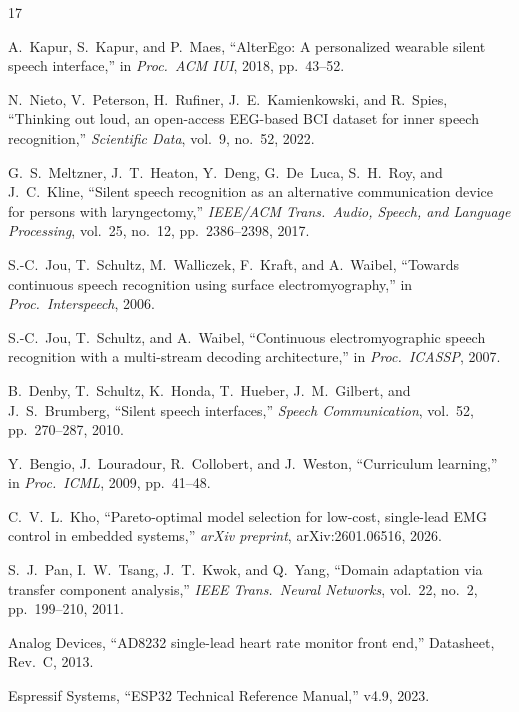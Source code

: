 \documentclass{article}
\begin{document}
\begin{thebibliography}{17}

A.\ Kapur, S.\ Kapur, and P.\ Maes, ``AlterEgo: A personalized wearable silent speech interface,'' in \emph{Proc.\ ACM IUI}, 2018, pp.\ 43--52.

N.\ Nieto, V.\ Peterson, H.\ Rufiner, J.~E.\ Kamienkowski, and R.\ Spies, ``Thinking out loud, an open-access EEG-based BCI dataset for inner speech recognition,'' \emph{Scientific Data}, vol.~9, no.~52, 2022.

G.~S.\ Meltzner, J.~T.\ Heaton, Y.\ Deng, G.\ De~Luca, S.~H.\ Roy, and J.~C.\ Kline, ``Silent speech recognition as an alternative communication device for persons with laryngectomy,'' \emph{IEEE/ACM Trans.\ Audio, Speech, and Language Processing}, vol.~25, no.~12, pp.\ 2386--2398, 2017.

S.-C.\ Jou, T.\ Schultz, M.\ Walliczek, F.\ Kraft, and A.\ Waibel, ``Towards continuous speech recognition using surface electromyography,'' in \emph{Proc.\ Interspeech}, 2006.

S.-C.\ Jou, T.\ Schultz, and A.\ Waibel, ``Continuous electromyographic speech recognition with a multi-stream decoding architecture,'' in \emph{Proc.\ ICASSP}, 2007.

B.\ Denby, T.\ Schultz, K.\ Honda, T.\ Hueber, J.~M.\ Gilbert, and J.~S.\ Brumberg, ``Silent speech interfaces,'' \emph{Speech Communication}, vol.~52, pp.\ 270--287, 2010.

Y.\ Bengio, J.\ Louradour, R.\ Collobert, and J.\ Weston, ``Curriculum learning,'' in \emph{Proc.\ ICML}, 2009, pp.\ 41--48.

C.~V.~L.\ Kho, ``Pareto-optimal model selection for low-cost, single-lead EMG control in embedded systems,'' \emph{arXiv preprint}, arXiv:2601.06516, 2026.

S.~J.\ Pan, I.~W.\ Tsang, J.~T.\ Kwok, and Q.\ Yang, ``Domain adaptation via transfer component analysis,'' \emph{IEEE Trans.\ Neural Networks}, vol.~22, no.~2, pp.\ 199--210, 2011.

Analog Devices, ``AD8232 single-lead heart rate monitor front end,'' Datasheet, Rev.~C, 2013.

Espressif Systems, ``ESP32 Technical Reference Manual,'' v4.9, 2023.




\end{thebibliography}
\end{document}
